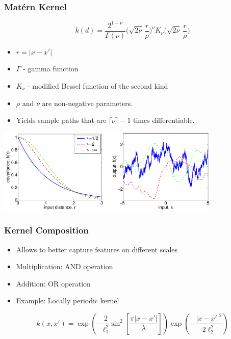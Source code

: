 \begin{frame} \frametitle{Mat\'ern Kernel}
\vspace{-3mm}
\begin{equation}
  k(d) = \frac{2^{1-\nu}}{\Gamma(\nu)}\Bigg(\sqrt{2\nu}\,\frac{r}{\rho}\Bigg)^\nu
    K_\nu\Bigg(\sqrt{2\nu}\,\frac{r}{\rho}\Bigg)
\end{equation}
\vspace{-3mm}
\begin{itemize}
  \item $r = |x-x'|$
  \item $\Gamma$ - gamma function
  \item $K_\nu$ - modified Bessel function of the second kind
  \item $\rho$ and $\nu$ are non-negative parameters.
  \item Yields sample paths that are $\lceil\nu\rceil - 1$ times differentiable.
\end{itemize}
\begin{center}
\includegraphics[width=0.8\textwidth]{matern}
\end{center}
\end{frame}

\begin{frame} \frametitle{Kernel Composition}
\begin{itemize}
  \item Allows to better capture features on different scales
  \item Multiplication: AND operation
  \item Addition: OR operation
  \item Example: Locally periodic kernel
\end{itemize}
\begin{equation}
  k(x,x') =
  \exp\left(-\frac{2}{\ell_1^2}\sin^2\left[\frac{\pi|x - x'|}{\lambda}\right]\right)
  \exp\left(-\frac{\left|x-x'\right|^2}{2\ell_2^2}\right)
\end{equation}
\end{frame}

